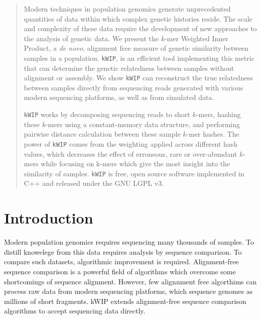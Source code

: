 \documentclass[a0,portrait]{a0poster}
\begin{document}
\begin{multicols}{2}


\begin{abstract}
\vspace{5mm}

Modern techniques in population genomics generate unprecedented quantities of
data within which complex genetic histories reside. The scale and complexity of
these data require the development of new approaches to the analysis of genetic
data. We present the $k$-mer Weighted Inner Product, a \textit{de novo},
alignment free measure of genetic similarity between samples in a population.
\texttt{kWIP}, is an efficient tool implementing this metric that can determine
the genetic relatedness between samples without alignment or assembly. We show
\texttt{kWIP} can reconstruct the true relatedness between samples directly
from sequencing reads generated with various modern sequencing platforms, as
well as from simulated data.

\texttt{kWIP} works by decomposing sequencing reads to short $k$-mers, hashing
these $k$-mers using a constant-memory data structure, and performing pairwise
distance calculation between these sample $k$-mer hashes. The power of
\texttt{kWIP} comes from the weighting applied across different hash values,
which decreases the effect of erroneous, rare or over-abundant $k$-mers while
focusing on k-mers which give the most insight into the similarity of samples.
\texttt{kWIP} is free, open source software implemented in C++ and released
under the GNU LGPL v3.

\end{abstract}


\section*{Introduction}

Modern population genomics requires sequencing many thousands of samples. To
distill knowelege from this data requires analysis by sequence comparison. To
compare such datasets, algorithmic improvement is required. Alignment-free
sequence comparison is a powerful field of algorithms which overcome some
shortcomings of sequence alignment. However, few alignnment free algorthims can
process raw data from modern sequencing platforms, which sequence genomes as
millions of short fragments. kWIP extends alignment-free sequence comparison
algorithms to accept sequencing data directly.


\end{multicols}
\end{document}
